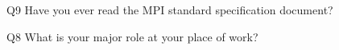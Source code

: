 \begin{description}%
\item{Q9} Have you ever read the MPI standard specification document?%
\item{Q8} What is your major role at your place of work?%
\end{description}%
